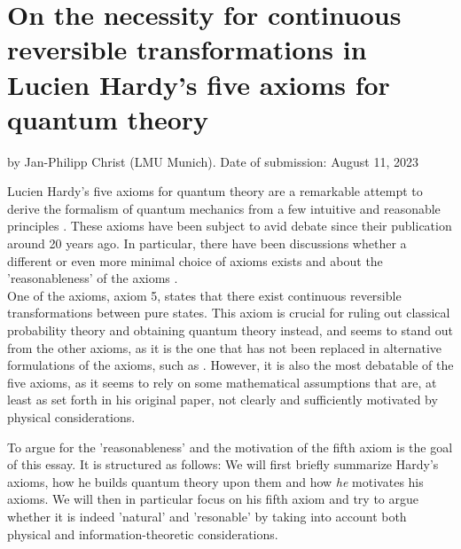 \documentclass[11pt, a4paper]{article}
\begin{document}
\pagestyle{fancy}
\renewcommand{\headrulewidth}{0pt}
\renewcommand{\footrulewidth}{0pt}
\fancyhf{}

\section*{On the necessity for continuous reversible transformations in Lucien Hardy's five axioms for quantum theory}
\vspace{-0.3cm}
\textsf{by Jan-Philipp Christ (LMU Munich). Date of submission: August 11, 2023}\par
\vspace{4pt}
Lucien Hardy's five axioms for quantum theory are a remarkable attempt to derive the formalism of quantum mechanics from a few intuitive and reasonable principles \cite{hardy2001quantum}. These axioms have been subject to avid debate since their publication around 20 years ago. In particular, there have been discussions whether a different or even more minimal choice of axioms exists \cite{Schack_2003, Masanes_2011} and about the 'reasonableness' of the axioms \cite{DARRIGOL}.\\
One of the axioms, axiom 5, states that there exist continuous reversible transformations between pure states. This axiom is crucial for ruling out classical probability theory and obtaining quantum theory instead, and seems to stand out from the other axioms, as it is the one that has not been replaced in alternative formulations of the axioms, such as \cite{Schack_2003, Masanes_2011}. However, it is also the most debatable of the five axioms, as it seems to rely on some mathematical assumptions that are, at least as set forth in his original paper, not clearly and sufficiently motivated by physical considerations.\par
To argue for the 'reasonableness' and the motivation of the fifth axiom is the goal of this essay. It is structured as follows: We will first briefly summarize Hardy's axioms, how he builds quantum theory upon them and how \emph{he} motivates his axioms. 
We will then in particular focus on his fifth axiom and try to argue whether it is indeed 'natural' and 'resonable' by taking into account both physical and information-theoretic considerations. \par
\vspace{8pt}
\end{document}
